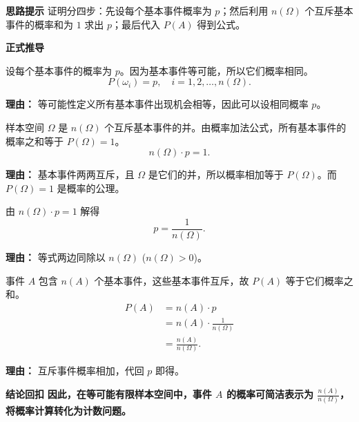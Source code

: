 \begin{proofbox}
	\textbf{\textcolor{CProof}{思路提示}}
	证明分四步：先设每个基本事件概率为 $p$；然后利用 $n(\Omega)$ 个互斥基本事件的概率和为 $1$ 求出 $p$；最后代入 $P(A)$ 得到公式。

	\medskip
	\textbf{\textcolor{CProof}{正式推导}}
	\begin{description}[style=nextline, leftmargin=2.8em, labelsep=0.5em, itemsep=0.55em]
		\item[\textbf{步骤一（设等可能概率）：}]
			设每个基本事件的概率为 $p$。因为基本事件等可能，所以它们概率相同。
			\[
				P(\omega_i) = p,\quad i=1,2,\dots,n(\Omega).
			\]
			\par\textbf{理由：} 等可能性定义所有基本事件出现机会相等，因此可以设相同概率 $p$。
		\item[\textbf{步骤二（总概率为1）：}]
			样本空间 $\Omega$ 是 $n(\Omega)$ 个互斥基本事件的并。由概率加法公式，所有基本事件的概率之和等于 $P(\Omega)=1$。
			\[
				n(\Omega) \cdot p = 1.
			\]
			\par\textbf{理由：} 基本事件两两互斥，且 $\Omega$ 是它们的并，所以概率相加等于 $P(\Omega)$。而 $P(\Omega)=1$ 是概率的公理。
		\item[\textbf{步骤三（解基本事件概率）：}]
			由 $n(\Omega) \cdot p = 1$ 解得
			\[
				p = \frac{1}{n(\Omega)}.
			\]
			\par\textbf{理由：} 等式两边同除以 $n(\Omega)$ ($n(\Omega)>0$)。
		\item[\textbf{步骤四（事件A概率）：}]
			事件 $A$ 包含 $n(A)$ 个基本事件，这些基本事件互斥，故 $P(A)$ 等于它们概率之和。
			\[
				\begin{aligned}
					P(A) &= n(A) \cdot p \\ &= n(A) \cdot \frac{1}{n(\Omega)} \\ &= \frac{n(A)}{n(\Omega)}.
			\end{aligned}
			\]
			\par\textbf{理由：} 互斥事件概率相加，代回 $p$ 即得。
	\end{description}

	\medskip
	\textbf{\textcolor{CProof}{结论回扣}}
	\textbf{因此，在等可能有限样本空间中，事件 $A$ 的概率可简洁表示为 $\frac{n(A)}{n(\Omega)}$，将概率计算转化为计数问题。}
\end{proofbox}
